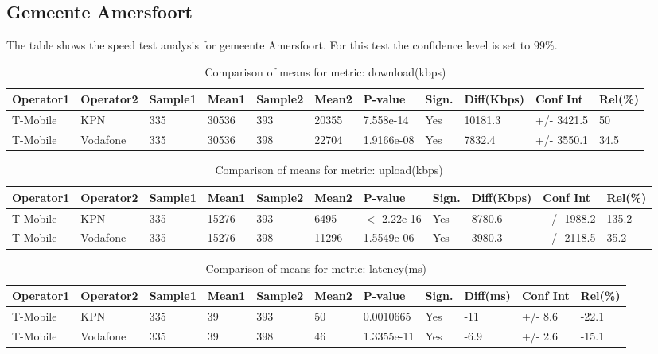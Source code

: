 \documentclass[]{article}
\begin{document}
\normalsize

\newpage

\subsection{Gemeente Amersfoort}\label{gemeente-amersfoort}

The table shows the speed test analysis for gemeente Amersfoort. For
this test the confidence level is set to 99\%.

\begin{table}[ht]
\centering
{\footnotesize
\begin{tabular}{lllllllllll}
  \hline
Operator1 & Operator2 & Sample1 & Mean1 & Sample2 & Mean2 & P-value & Sign. & Diff(Kbps) & Conf Int & Rel(\%) \\ 
  \hline
T-Mobile & KPN & 335 & 30536 & 393 & 20355 & 7.558e-14 & Yes & 10181.3 & +/- 3421.5 & 50 \\ 
  T-Mobile & Vodafone & 335 & 30536 & 398 & 22704 & 1.9166e-08 & Yes & 7832.4 & +/- 3550.1 & 34.5 \\ 
   \hline
\end{tabular}
}
\caption{Comparison of means for metric: download(kbps)} 
\end{table}

\begin{table}[ht]
\centering
{\footnotesize
\begin{tabular}{lllllllllll}
  \hline
Operator1 & Operator2 & Sample1 & Mean1 & Sample2 & Mean2 & P-value & Sign. & Diff(Kbps) & Conf Int & Rel(\%) \\ 
  \hline
T-Mobile & KPN & 335 & 15276 & 393 & 6495 & $<$ 2.22e-16 & Yes & 8780.6 & +/- 1988.2 & 135.2 \\ 
  T-Mobile & Vodafone & 335 & 15276 & 398 & 11296 & 1.5549e-06 & Yes & 3980.3 & +/- 2118.5 & 35.2 \\ 
   \hline
\end{tabular}
}
\caption{Comparison of means for metric: upload(kbps)} 
\end{table}

\begin{table}[ht]
\centering
{\footnotesize
\begin{tabular}{lllllllllll}
  \hline
Operator1 & Operator2 & Sample1 & Mean1 & Sample2 & Mean2 & P-value & Sign. & Diff(ms) & Conf Int & Rel(\%) \\ 
  \hline
T-Mobile & KPN & 335 & 39 & 393 & 50 & 0.0010665 & Yes & -11 & +/- 8.6 & -22.1 \\ 
  T-Mobile & Vodafone & 335 & 39 & 398 & 46 & 1.3355e-11 & Yes & -6.9 & +/- 2.6 & -15.1 \\ 
   \hline
\end{tabular}
}
\caption{Comparison of means for metric: latency(ms)} 
\end{table}
\end{document}
